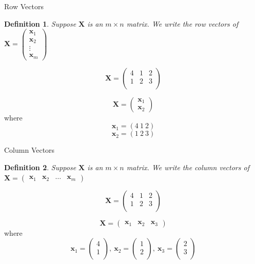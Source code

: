 \documentclass[handout]{beamer}
\newtheorem{defn}{Definition}
\numberwithin{equation}{section}
\begin{document}
\begin{frame}{Row Vectors}

\begin{defn} Suppose $\boldsymbol{X}$ is an $m \times n$ matrix. We write the row vectors of $\boldsymbol{X} = \begin{pmatrix} \boldsymbol{x}_{1} \\ \boldsymbol{x}_{2} \\ \vdots\\ \boldsymbol{x}_{m} \end{pmatrix} $ 
\end{defn}

$$\boldsymbol{X} = \begin{pmatrix} 4 & 1 & 2 \\1 & 2  & 3 \\ \end{pmatrix} $$

$$\boldsymbol{X} = \begin{pmatrix} \boldsymbol{x}_{1}  \\\boldsymbol{x}_{2} \end{pmatrix} $$ 
where
$$\boldsymbol{x}_{1}=(4\  1\  2)$$
$$\boldsymbol{x}_{2}=(1\  2\  3)$$

\end{frame}


\begin{frame}{Column Vectors}

\begin{defn} Suppose $\boldsymbol{X}$ is an $m \times n$ matrix. We write the column vectors of $\boldsymbol{X} = \begin{pmatrix} \boldsymbol{x}_{1} & \boldsymbol{x}_{2} & \ldots& \boldsymbol{x}_{m} \end{pmatrix} $ 
\end{defn}

$$\boldsymbol{X} = \begin{pmatrix} 4 & 1 & 2 \\1 & 2  & 3 \\ \end{pmatrix} $$

$$\boldsymbol{X} = \begin{pmatrix} \boldsymbol{x}_{1}  & \boldsymbol{x}_{2} & \boldsymbol{x}_{3} \end{pmatrix} $$ 
where
$$\boldsymbol{x}_{1}= \begin{pmatrix} 4 \\1  \\ \end{pmatrix}, \ \boldsymbol{x}_{2}=\begin{pmatrix} 1 \\2\\ \end{pmatrix}, \ \boldsymbol{x}_{3}=\begin{pmatrix} 2 \\3\\ \end{pmatrix}$$

\end{frame}
\end{document}
